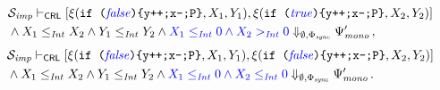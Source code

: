 \begin{equation}\label{ex:case3}
\begin{aligned}
  & \mathcal{S}_{\mathit{imp}} \vdash_{\mathsf{CRL}}
  [ \xi(\texttt{if (}{\color{blue}\mathit{false}}\texttt{)\{y++;x--;P\}}, X_1, Y_1),  
    \xi(\texttt{if (}{\color{blue}\mathit{true}}\texttt{)\{y++;x--;P\}}, X_2, Y_2) ] \\
  & \land X_1 \leq_{\mathit{Int}} X_2 \land Y_1 \leq_{\mathit{Int}} Y_2 \land {\color{blue} X_1 \leq_{\mathit{Int}} 0 \land X_2 >_{\mathit{Int}} 0 }
  \Downarrow_{\emptyset, \Phi_{\mathit{sync}}} \Psi^\prime_{\mathit{mono}} \, ,
\end{aligned}
\end{equation}
\begin{equation}\label{ex:case4}
\begin{aligned}
  & \mathcal{S}_{\mathit{imp}} \vdash_{\mathsf{CRL}}
  [ \xi(\texttt{if (}{\color{blue}\mathit{false}}\texttt{)\{y++;x--;P\}}, X_1, Y_1) ,  
    \xi(\texttt{if (}{\color{blue}\mathit{false}}\texttt{)\{y++;x--;P\}}, X_2, Y_2) ] \\
  & \land X_1 \leq_{\mathit{Int}} X_2 \land Y_1 \leq_{\mathit{Int}} Y_2 \land {\color{blue} X_1 \leq_{\mathit{Int}} 0 \land X_2 \leq_{\mathit{Int}} 0 }
  \Downarrow_{\emptyset, \Phi_{\mathit{sync}}} \Psi^\prime_{\mathit{mono}} \, .
\end{aligned}
\end{equation}
